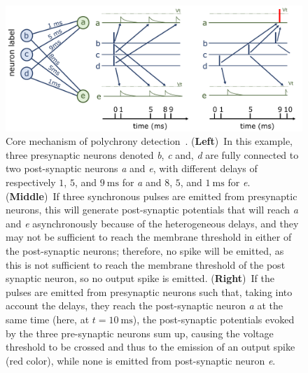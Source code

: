 \documentclass[brainsci, %
               review,accept,pdftex,moreauthors
               ]{Definitions/mdpi}
\newcommand{\ms}{\si{\milli\second}}%
\begin{document}
\begin{figure}[H]%
  \includegraphics[width=0.980\linewidth]{figures/izhikevich.pdf}%
    \caption{
      Core mechanism of polychrony detection~\citep{izhikevich_polychronization_2006}.
       {(\textbf{Left})}~In this example, three presynaptic neurons denoted \textit{b}, \textit{c} and, \textit{d} are fully connected to two post-synaptic neurons \textit{a} and \textit{e}, with different delays of respectively $1$, $5$, and $9~\ms$ for \textit{a} and  $8$, $5$, and $1~\ms$ for \textit{e}. {(\textbf{Middle})}~If three synchronous pulses are emitted from presynaptic neurons, this will generate post-synaptic potentials that will reach \textit{a} and \textit{e} asynchronously because of the heterogeneous delays, and they may not be sufficient to reach the membrane threshold in either of the post-synaptic neurons; therefore, no spike will be emitted, as this is not sufficient to reach the membrane threshold of the post synaptic neuron, so no output spike is emitted.
    {(\textbf{Right})}~If the pulses are emitted from presynaptic neurons such that, taking into account the delays, they reach the post-synaptic neuron \textit{a} at the same time (here, at $t=10~\ms$),  the post-synaptic potentials evoked by the three pre-synaptic neurons sum up, causing the voltage threshold to be crossed and thus to the emission of an output spike (red color), while none is emitted from post-synaptic neuron \textit{e}.
     }
  \label{fig:izhikevich}
\end{figure}
%
%
\end{document}
